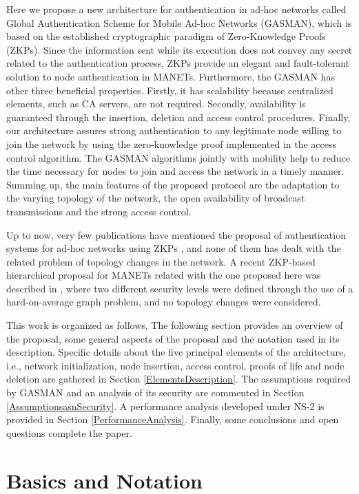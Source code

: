 \documentclass[conference]{IEEEtran}
\begin{document}
Here we propose a new architecture for authentication in ad-hoc
networks called Global Authentication Scheme for Mobile Ad-hoc
Networks (GASMAN), which is based on the established cryptographic
paradigm of Zero-Knowledge Proofs (ZKPs). Since the information
sent while its execution does not convey any secret related to the
authentication process, ZKPs provide an elegant and fault-tolerant
solution to node authentication in MANETs. Furthermore, the GASMAN
has other three beneficial properties. Firstly, it has scalability
because centralized elements, such as CA servers, are not
required. Secondly, availability is guaranteed through the
insertion, deletion and access control procedures. Finally, our
architecture assures strong authentication to any legitimate node
willing to join the network by using the zero-knowledge proof
implemented in the access control algorithm. The GASMAN algorithms
jointly with mobility help to reduce the time necessary for nodes
to join and access the network in a timely manner. Summing up, the
main features of the proposed protocol are the adaptation to the
varying topology of the network, the open availability of
broadcast transmissions and the strong access control.

Up to now, very few
publications have  mentioned the proposal of authentication
systems for ad-hoc networks using ZKPs \cite{ARMF06}
\cite{WZK05}, and none of them has dealt with the related problem
of topology changes in the network. A recent ZKP-based
hierarchical proposal for MANETs related with the one proposed
here was described in \cite{CH06}, where two different security
levels were defined through the use of a hard-on-average graph
problem, and no topology changes were considered.

This work is organized as follows. The following section provides
an overview of the proposal, some general aspects of the proposal and the notation used in its description. Specific details about the five principal elements of the architecture, i.e.,  network initialization, node insertion, access control, proofs of life and node deletion are gathered in Section \ref{ElementsDescription}. The assumptions required by GASMAN and an analysis of its security are
commented in Section \ref{AssumptionsasnSecurity}. A performance analysis developed under NS-2 is provided in
Section \ref{PerformanceAnalysis}. Finally, some conclusions and open questions complete
the paper.


\section{Basics and Notation}
\end{document}
